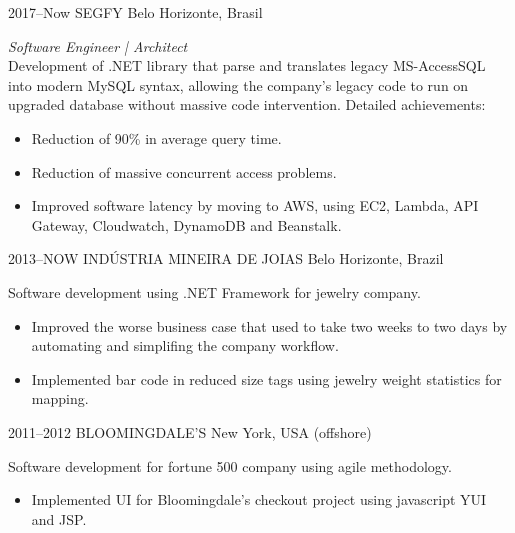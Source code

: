 \documentclass[]{friggeri-cv-a4}
\begin{document}
\begin{entrylist}

\entry
{2017--Now}
{SEGFY}
{Belo Horizonte, Brasil}
{\emph{Software Engineer | Architect} \\

Development of .NET library that parse and translates legacy MS-AccessSQL into modern MySQL syntax, allowing the company's legacy code to run on upgraded database without massive code intervention.
Detailed achievements:
\begin{itemize}
    \item Reduction of 90\% in average query time.
    \item Reduction of massive concurrent access problems.
    \item Improved software latency by moving to AWS, using EC2, Lambda, API Gateway, Cloudwatch, DynamoDB and Beanstalk.
\end{itemize}}

\entry
{2013--NOW}
{INDÚSTRIA MINEIRA DE JOIAS}
{Belo Horizonte, Brazil}
{ Software development using .NET Framework for jewelry company.
\begin{itemize}
    \item Improved the worse business case that used to take two weeks to two days by automating and simplifing the company workflow. 
    \item Implemented bar code in reduced size tags using jewelry weight statistics for mapping.
\end{itemize}
}



\entry
{2011--2012}
{BLOOMINGDALE'S}
{New York, USA (offshore)}
{Software development for fortune 500 company using agile methodology.
\begin{itemize}
    \item Implemented UI for Bloomingdale's checkout project using javascript YUI and JSP.
\end{itemize}
}


\end{entrylist}
\end{document}
